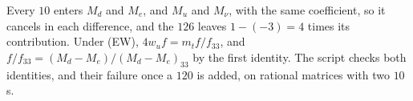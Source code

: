 Every $10$ enters $M_{d}$ and $M_{e}$, and $M_{u}$ and $M_{\nu}$, with the same coefficient, so it cancels in each difference, and the $126$ leaves $1 - (-3) = 4$ times its contribution. Under (EW), $4w_{u}f = m_{t}f/f_{33}$, and $f/f_{33} = (M_{d} - M_{e})/(M_{d} - M_{e})_{33}$ by the first identity. The script checks both identities, and their failure once a $120$ is added, on rational matrices with two $10$s.
